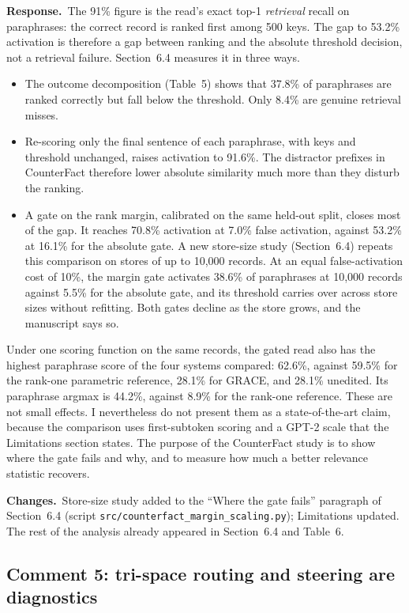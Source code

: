 \documentclass[11pt]{article}
\newcommand{\response}{\par\noindent\textbf{Response.}\ }
\newcommand{\changes}{\par\smallskip\noindent\textbf{Changes.}\ }
\begin{document}
\response The 91\% figure is the read's exact top-1 \emph{retrieval} recall on paraphrases: the correct record is ranked first among 500 keys. The gap to 53.2\% activation is therefore a gap between ranking and the absolute threshold decision, not a retrieval failure. Section~6.4 measures it in three ways.
\begin{itemize}
\item The outcome decomposition (Table~5) shows that 37.8\% of paraphrases are ranked correctly but fall below the threshold. Only 8.4\% are genuine retrieval misses.
\item Re-scoring only the final sentence of each paraphrase, with keys and threshold unchanged, raises activation to 91.6\%. The distractor prefixes in CounterFact therefore lower absolute similarity much more than they disturb the ranking.
\item A gate on the rank margin, calibrated on the same held-out split, closes most of the gap. It reaches 70.8\% activation at 7.0\% false activation, against 53.2\% at 16.1\% for the absolute gate. A new store-size study (Section~6.4) repeats this comparison on stores of up to 10,000 records. At an equal false-activation cost of 10\%, the margin gate activates 38.6\% of paraphrases at 10,000 records against 5.5\% for the absolute gate, and its threshold carries over across store sizes without refitting. Both gates decline as the store grows, and the manuscript says so.
\end{itemize}
Under one scoring function on the same records, the gated read also has the highest paraphrase score of the four systems compared: 62.6\%, against 59.5\% for the rank-one parametric reference, 28.1\% for GRACE, and 28.1\% unedited. Its paraphrase argmax is 44.2\%, against 8.9\% for the rank-one reference. These are not small effects. I nevertheless do not present them as a state-of-the-art claim, because the comparison uses first-subtoken scoring and a GPT-2 scale that the Limitations section states. The purpose of the CounterFact study is to show where the gate fails and why, and to measure how much a better relevance statistic recovers.

\changes Store-size study added to the ``Where the gate fails'' paragraph of Section~6.4 (script \nolinkurl{src/counterfact_margin_scaling.py}); Limitations updated. The rest of the analysis already appeared in Section~6.4 and Table~6.

\subsection*{Comment 5: tri-space routing and steering are diagnostics}
\end{document}
